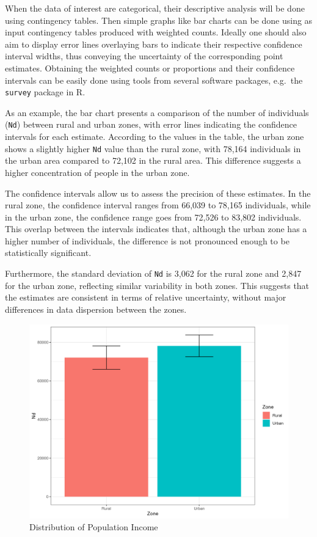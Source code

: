 \documentclass[
  12pt,
]{book}
\begin{document}
When the data of interest are categorical, their descriptive analysis will be done using contingency tables. Then simple graphs like bar charts can be done using as input contingency tables produced with weighted counts. Ideally one should also aim to display error lines overlaying bars to indicate their respective confidence interval widths, thus conveying the uncertainty of the corresponding point estimates. Obtaining the weighted counts or proportions and their confidence intervals can be easily done using tools from several software packages, e.g.~the \texttt{survey} package in R.

As an example, the bar chart presents a comparison of the number of individuals (\texttt{Nd}) between rural and urban zones, with error lines indicating the confidence intervals for each estimate. According to the values in the table, the urban zone shows a slightly higher \texttt{Nd} value than the rural zone, with 78,164 individuals in the urban area compared to 72,102 in the rural area. This difference suggests a higher concentration of people in the urban zone.

The confidence intervals allow us to assess the precision of these estimates. In the rural zone, the confidence interval ranges from 66,039 to 78,165 individuals, while in the urban zone, the confidence range goes from 72,526 to 83,802 individuals. This overlap between the intervals indicates that, although the urban zone has a higher number of individuals, the difference is not pronounced enough to be statistically significant.

Furthermore, the standard deviation of \texttt{Nd} is 3,062 for the rural zone and 2,847 for the urban zone, reflecting similar variability in both zones. This suggests that the estimates are consistent in terms of relative uncertainty, without major differences in data dispersion between the zones.

\begin{figure}
\includegraphics[width=33.33in]{www/05_graficas/03_bar_pers} \caption{Distribution of Population Income}\label{fig:barIncome}
\end{figure}
\end{document}
